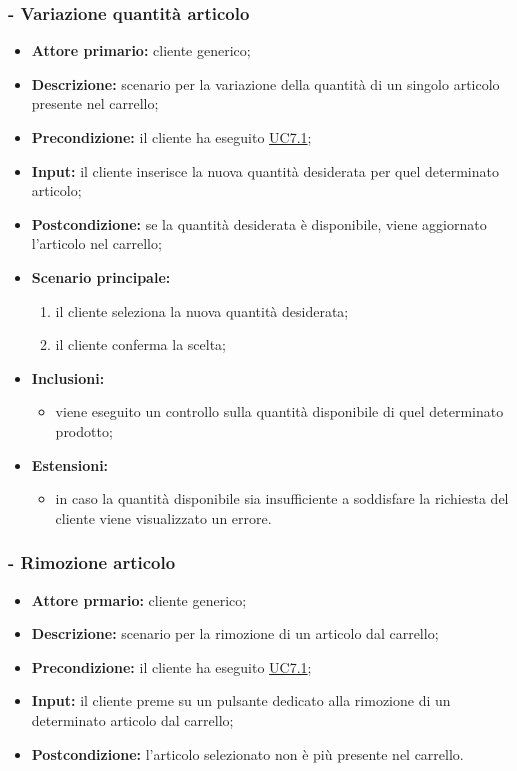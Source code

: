 \subsubsection{ - Variazione quantità articolo}
\begin{itemize}
    \item \textbf{Attore primario:} cliente generico;
    \item \textbf{Descrizione:} scenario per la variazione della quantità di un singolo articolo presente nel carrello;
    \item \textbf{Precondizione:} il cliente ha eseguito \hyperref[UC7.1]{UC7.1};
    \item \textbf{Input:} il cliente inserisce la nuova quantità desiderata per quel determinato articolo;
    \item \textbf{Postcondizione:} se la quantità desiderata è disponibile, viene aggiornato l'articolo nel carrello;
    \item \textbf{Scenario principale:}
          \begin{enumerate}
              \item il cliente seleziona la nuova quantità desiderata;
              \item il cliente conferma la scelta;
          \end{enumerate}
    \item \textbf{Inclusioni:}
          \begin{itemize}
              \item viene eseguito un controllo sulla quantità disponibile di quel determinato prodotto;
          \end{itemize}
    \item \textbf{Estensioni:}
          \begin{itemize}
              \item in caso la quantità disponibile sia insufficiente a soddisfare la richiesta del cliente viene visualizzato un errore.
          \end{itemize}
\end{itemize}

\stepsubUserCase
\subsubsection{ - Rimozione articolo}
\begin{itemize}
    \item \textbf{Attore prmario:} cliente generico;
    \item \textbf{Descrizione:} scenario per la rimozione di un articolo dal carrello;
    \item \textbf{Precondizione:} il cliente ha eseguito \hyperref[UC7.1]{UC7.1};
    \item \textbf{Input:} il cliente preme su un pulsante dedicato alla rimozione di un determinato articolo dal carrello;
    \item \textbf{Postcondizione:} l'articolo selezionato non è più presente nel carrello.
\end{itemize}

